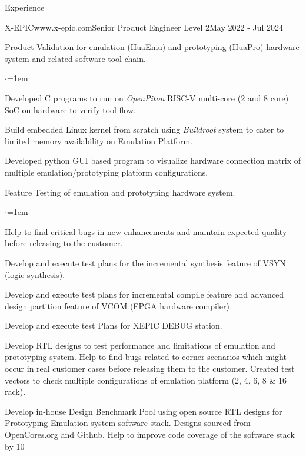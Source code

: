 \documentclass[
11pt, %
]{./assets/resume} %
\begin{document}
\begin{rSection}{Experience}
	\begin{rSubsectionX}{X-EPIC}{www.x-epic.com}{Senior Product Engineer Level 2}{May 2022 - Jul 2024}
		\item Product Validation for emulation (HuaEmu) and prototyping (HuaPro) hardware system and related software tool chain.
		\begin{list}{$\cdot$}{\leftmargin=1em}
			\setlength{\itemsep}{-0.5em} \vspace{-0.5em}
			\item Developed C programs to run on \textit{OpenPiton} RISC-V multi-core (2 and 8 core) SoC on hardware to verify tool flow.
			\item Build embedded Linux kernel from scratch using \textit{Buildroot} system to cater to limited memory availability on Emulation Platform.
			\item Developed python GUI based program to visualize hardware connection matrix of multiple emulation/prototyping platform configurations.	
		\end{list}
		\item Feature Testing of emulation and prototyping hardware system.
		\begin{list}{$\cdot$}{\leftmargin=1em}
			\setlength{\itemsep}{-0.5em} \vspace{-0.5em}
			\item Help to find critical bugs in new enhancements and maintain expected quality before releasing to the customer.
			\item Develop and execute test plans for the incremental synthesis feature of VSYN (logic synthesis).
			\item Develop and execute test plans for incremental compile feature and advanced design partition feature of VCOM (FPGA hardware compiler)
			\item Develop and execute test Plans for XEPIC DEBUG station.
	    \end{list}
		\item Develop RTL designs to test performance and limitations of emulation and prototyping system. Help to find bugs related to corner scenarios which might occur in real customer cases before releasing them to the customer. Created test vectors to check multiple configurations of emulation platform (2, 4, 6, 8 \& 16 rack).
		\item Develop in-house Design Benchmark Pool using open source RTL designs for Prototyping Emulation system software stack. Designs sourced from OpenCores.org and Github. Help to improve code coverage of the software stack by 10%

\end{rSubsectionX}
\end{rSection}
\end{document}

